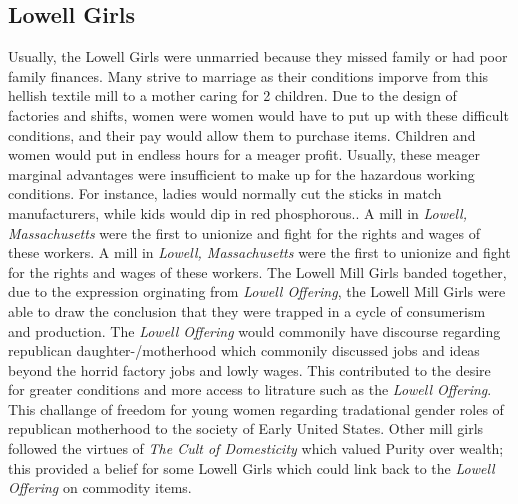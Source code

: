\documentclass{article}
\begin{document}
\subsection{Lowell Girls}
Usually, the Lowell Girls were unmarried because they missed family or had poor family finances. Many strive to marriage as their conditions imporve from this hellish textile mill to a mother caring for 2 children. Due to the design of factories and shifts, women were  women would have to put up with these difficult conditions, and their pay would allow them to purchase items. Children and women would put in endless hours for a meager profit. Usually, these meager marginal advantages were insufficient to make up for the hazardous working conditions. For instance, ladies would normally cut the sticks in match manufacturers, while kids would dip in red phosphorous.\citep[117]{stansell1982}. A mill in \emph{Lowell, Massachusetts} were the first to unionize and fight for the rights and wages of these workers. A mill in \emph{Lowell, Massachusetts} were the first to unionize and fight for the rights and wages of these workers. The Lowell Mill Girls banded together, due to the expression orginating from \emph{Lowell Offering}, the Lowell Mill Girls were able to draw the conclusion that they were trapped in a cycle of consumerism and production. The \emph{Lowell Offering} would commonily have discourse regarding republican daughter-/motherhood which commonily discussed jobs and ideas beyond the horrid factory jobs and lowly wages. \parencite{kanzler2005} This contributed to the desire for greater conditions and more access to litrature such as the \emph{Lowell Offering}. This challange of freedom for young women regarding tradational gender roles of republican motherhood to the society of Early United States. Other mill girls followed the virtues of \emph{The Cult of Domesticity} which valued Purity over wealth; this provided a belief for some Lowell Girls which could link back to the \emph{Lowell Offering} on commodity items.
\end{document}

